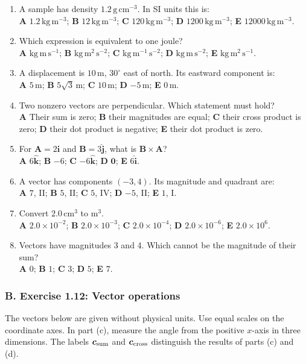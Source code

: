 \documentclass[11pt,letterpaper]{article}
\newcommand{\vect}[1]{\boldsymbol{#1}}
\newcommand{\uv}[1]{\hat{\boldsymbol{#1}}}
\newcommand{\unit}[1]{\,\mathrm{#1}}
\newcommand{\degree}{^{\circ}}
\begin{document}
\begin{enumerate}[label=\textbf{\arabic*.}]
\item A sample has density $1.2\unit{g\,cm^{-3}}$. In SI units this is:\\
\textbf{A} $1.2\unit{kg\,m^{-3}}$; \textbf{B} $12\unit{kg\,m^{-3}}$; \textbf{C} $120\unit{kg\,m^{-3}}$; \textbf{D} $1200\unit{kg\,m^{-3}}$; \textbf{E} $12000\unit{kg\,m^{-3}}$.
\item Which expression is equivalent to one joule?\\
\textbf{A} $\mathrm{kg\,m\,s^{-1}}$; \textbf{B} $\mathrm{kg\,m^2\,s^{-2}}$; \textbf{C} $\mathrm{kg\,m^{-1}\,s^{-2}}$; \textbf{D} $\mathrm{kg\,m\,s^{-2}}$; \textbf{E} $\mathrm{kg\,m^2\,s^{-1}}$.
\item A displacement is $10\unit{m}$, $30\degree$ east of north. Its eastward component is:\\
\textbf{A} $5\unit{m}$; \textbf{B} $5\sqrt3\unit{m}$; \textbf{C} $10\unit{m}$; \textbf{D} $-5\unit{m}$; \textbf{E} $0\unit{m}$.
\item Two nonzero vectors are perpendicular. Which statement must hold?\\
\textbf{A} Their sum is zero; \textbf{B} their magnitudes are equal; \textbf{C} their cross product is zero; \textbf{D} their dot product is negative; \textbf{E} their dot product is zero.
\item For $\vect A=2\uv i$ and $\vect B=3\uv j$, what is $\vect B\times\vect A$?\\
\textbf{A} $6\uv k$; \textbf{B} $-6$; \textbf{C} $-6\uv k$; \textbf{D} $\vect0$; \textbf{E} $6\uv i$.
\item A vector has components $(-3,4)$. Its magnitude and quadrant are:\\
\textbf{A} $7$, II; \textbf{B} $5$, II; \textbf{C} $5$, IV; \textbf{D} $-5$, II; \textbf{E} $1$, I.
\item Convert $2.0\unit{cm^3}$ to $\mathrm{m^3}$.\\
\textbf{A} $2.0\times10^{-2}$; \textbf{B} $2.0\times10^{-3}$; \textbf{C} $2.0\times10^{-4}$; \textbf{D} $2.0\times10^{-6}$; \textbf{E} $2.0\times10^6$.
\item Vectors have magnitudes 3 and 4. Which cannot be the magnitude of their sum?\\
\textbf{A} $0$; \textbf{B} $1$; \textbf{C} $3$; \textbf{D} $5$; \textbf{E} $7$.
\end{enumerate}

\subsubsection*{B. Exercise 1.12: Vector operations}
The vectors below are given without physical units. Use equal scales on the coordinate axes. In part (c), measure the angle from the positive $x$-axis in three dimensions. The labels $\vect c_{\rm sum}$ and $\vect c_{\rm cross}$ distinguish the results of parts (c) and (d).
\end{document}
